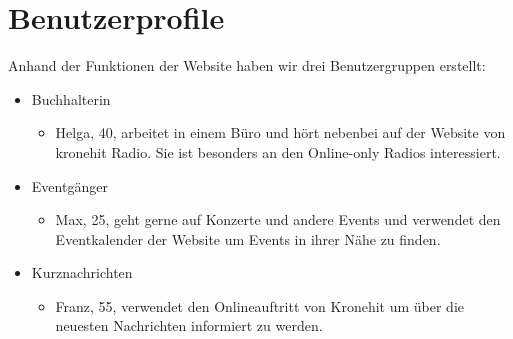 \documentclass{article}
\begin{document}
	\section{Benutzerprofile}
	Anhand der Funktionen der Website haben wir drei Benutzergruppen erstellt:
	\begin{itemize}
		\item{Buchhalterin}
		\begin{itemize}
			\item{Helga, 40, arbeitet in einem Büro und hört nebenbei auf der Website von kronehit Radio. Sie ist besonders an den Online-only Radios interessiert.}
		\end{itemize}
		\item{Eventgänger}
		\begin{itemize}
			\item{Max, 25, geht gerne auf Konzerte und andere Events und verwendet den Eventkalender der Website um Events in ihrer Nähe zu finden.}
		\end{itemize}
		\item{Kurznachrichten}
		\begin{itemize}
			\item{Franz, 55, verwendet den Onlineauftritt von Kronehit um über die neuesten Nachrichten informiert zu werden.}
		\end{itemize}
	\end{itemize}
\end{document}
